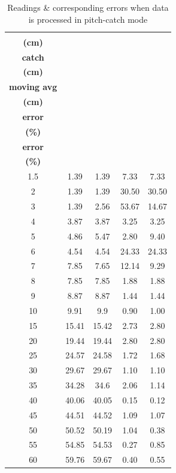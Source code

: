 \documentclass[10pt, conference, compsocconf]{IEEEtran}
\begin{document}
\begin{table}[!t]
\centering
\caption{Readings \& corresponding errors when data is processed in pitch-catch mode}
\scriptsize
\setlength{\tabcolsep}{3pt}
\begin{tabular}{|c|c|c|c|c|}
\hline
\shortstack{\textbf{Actual}\\\textbf{(cm)}} & \shortstack{\textbf{Pitch-}\\\textbf{catch}\\\textbf{(cm)}} & \shortstack{\textbf{Pitch-catch with}\\\textbf{moving avg}\\\textbf{(cm)}} & \shortstack{\textbf{Pitch-catch}\\\textbf{error}\\\textbf{(\%)}} & \shortstack{\textbf{Pitch-catch moving avg}\\\textbf{error}\\\textbf{(\%)}} \\ \hline
1.5 & 1.39 & 1.39 & 7.33 & 7.33 \\ \hline
2 & 1.39 & 1.39 & 30.50 & 30.50 \\ \hline
3 & 1.39 & 2.56 & 53.67 & 14.67 \\ \hline
4 & 3.87 & 3.87 & 3.25 & 3.25 \\ \hline
5 & 4.86 & 5.47 & 2.80 & 9.40 \\ \hline
6 & 4.54 & 4.54 & 24.33 & 24.33 \\ \hline
7 & 7.85 & 7.65 & 12.14 & 9.29 \\ \hline
8 & 7.85 & 7.85 & 1.88 & 1.88 \\ \hline
9 & 8.87 & 8.87 & 1.44 & 1.44 \\ \hline
10 & 9.91 & 9.9 & 0.90 & 1.00 \\ \hline
15 & 15.41 & 15.42 & 2.73 & 2.80 \\ \hline
20 & 19.44 & 19.44 & 2.80 & 2.80 \\ \hline
25 & 24.57 & 24.58 & 1.72 & 1.68 \\ \hline
30 & 29.67 & 29.67 & 1.10 & 1.10 \\ \hline
35 & 34.28 & 34.6 & 2.06 & 1.14 \\ \hline
40 & 40.06 & 40.05 & 0.15 & 0.12 \\ \hline
45 & 44.51 & 44.52 & 1.09 & 1.07 \\ \hline
50 & 50.52 & 50.19 & 1.04 & 0.38 \\ \hline
55 & 54.85 & 54.53 & 0.27 & 0.85 \\ \hline
60 & 59.76 & 59.67 & 0.40 & 0.55 \\ \hline

\end{tabular}
\end{table}
\end{document}
